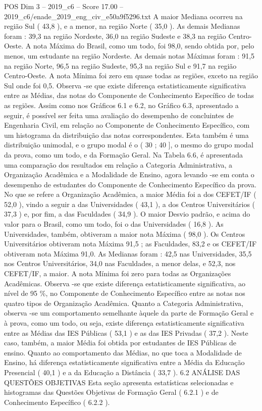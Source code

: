 \begin{textsample}{POS Dim 3 – 2019\_c6 – Score 17.00 – 2019\_c6/enade\_2019\_eng\_civ\_e50a9f5296.txt}
A maior Mediana ocorreu na região Sul ( 43,8 ), e a menor, na região Norte ( 35,0 ).
As demais Medianas foram : 39,3 na região Nordeste, 36,0 na região Sudeste e 38,3 na região Centro-Oeste.
A nota Máxima do Brasil, como um todo, foi 98,0, sendo obtida por, pelo menos, um estudante na região Nordeste.
As demais notas Máximas foram : 91,5 na região Norte, 96,5 na região Sudeste, 95,3 na região Sul e 91,7 na região Centro-Oeste.
A nota Mínima foi zero em quase todas as regiões, exceto na região Sul onde foi 0,5.
Observa -se que existe diferença estatisticamente significativa entre as Médias, das notas do Componente de Conhecimento Específico de todas as regiões.
Assim como nos Gráficos 6.1 e 6.2, no Gráfico 6.3, apresentado a seguir, é possível ser feita uma avaliação do desempenho de concluintes de Engenharia Civil, em relação ao Componente de Conhecimento Específico, com um histograma da distribuição das notas correspondentes.
Esta também é uma distribuição unimodal, e o grupo modal é o ( 30 ; 40 ], o mesmo do grupo modal da prova, como um todo, e da Formação Geral.
Na Tabela 6.6, é apresentada uma comparação dos resultados em relação a Categoria Administrativa, a Organização Acadêmica e a Modalidade de Ensino, agora levando -se em conta o desempenho de estudantes do Componente de Conhecimento Específico da prova.
No que se refere a Organização Acadêmica, a maior Média foi a dos CEFET/IF ( 52,0 ), vindo a seguir a das Universidades ( 43,1 ), a dos Centros Universitários ( 37,3 ) e, por fim, a das Faculdades ( 34,9 ).
O maior Desvio padrão, e acima do valor para o Brasil, como um todo, foi o das Universidades ( 16,8 ).
As Universidades, também, obtiveram a maior nota Máxima ( 98,0 ).
Os Centros Universitários obtiveram nota Máxima 91,5 ; as Faculdades, 83,2 e os CEFET/IF obtiveram nota Máxima 91,0.
As Medianas foram : 42,5 nas Universidades, 35,5 nos Centros Universitários, 34,0 nas Faculdades, a menor delas, e 52,3, nos CEFET/IF, a maior.
A nota Mínima foi zero para todas as Organizações Acadêmicas.
Observa -se que existe diferença estatisticamente significativa, ao nível de 95 \%, no Componente de Conhecimento Específico entre as notas nos quatro tipos de Organização Acadêmica.
Quanto a Categoria Administrativa, observa -se um comportamento semelhante àquele da parte de Formação Geral e à prova, como um todo, ou seja, existe diferença estatisticamente significativa entre as Médias das IES Públicas ( 53,1 ) e as das IES Privadas ( 37,2 ).
Neste caso, também, a maior Média foi obtida por estudantes de IES Públicas de ensino.
Quanto ao comportamento das Médias, no que toca a Modalidade de Ensino, há diferença estatisticamente significativa entre a Média da Educação Presencial ( 40,1 ) e a da Educação a Distância ( 33,7 ). 6.2 ANÁLISE DAS QUESTÕES OBJETIVAS Esta seção apresenta estatísticas selecionadas e histogramas das Questões Objetivas de Formação Geral ( 6.2.1 ) e de Conhecimento Específico ( 6.2.2 ).

\end{textsample}
